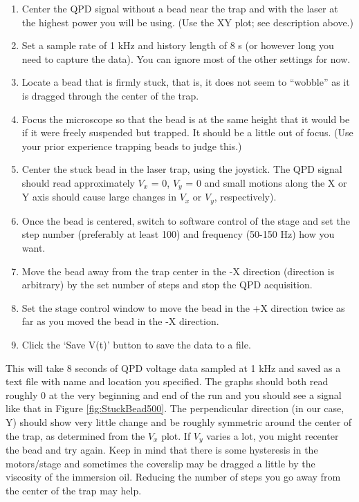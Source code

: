 \documentclass{../lab}
\begin{document}
\begin{enumerate}
    \item Center the QPD signal without a bead near the trap and with the laser at the highest power you will be using. (Use the XY plot; see description above.)

    \item Set a sample rate of 1 kHz and history length of 8 s (or however long you need to capture the data). You can ignore most of the other settings for now.

    \item Locate a bead that is firmly stuck, that is, it does not seem to ``wobble'' as it is dragged through the center of the trap.

    \item Focus the microscope so that the bead is at the same height that it would be if it were freely suspended but trapped. It should be a little out of focus. (Use your prior experience trapping beads to judge this.)

    \item Center the stuck bead in the laser trap, using the joystick. The QPD signal should read approximately $V_x$ = 0, $V_y$ = 0 and small motions along the X or Y axis should cause large changes in $V_x$ or $V_y$, respectively).

    \item Once the bead is centered, switch to software control of the stage and set the step number (preferably at least 100) and frequency (50-150 Hz) how you want.

    \item Move the bead away from the trap center in the -X direction (direction is arbitrary) by the set number of steps and stop the QPD acquisition.

    \item Set the stage control window to move the bead in the +X direction twice as far as you moved the bead in the -X direction.

    \item Click the `Save V(t)' button to save the data to a file.

\end{enumerate}

This will take 8 seconds of QPD voltage data sampled at 1 kHz and saved as a text file with name and location you specified.  The graphs should both read roughly 0 at the very beginning and end of the run and you should see a signal like that in Figure \ref{fig:StuckBead500}. The perpendicular direction (in our case, Y) should show very little change and be roughly symmetric around the center of the trap, as determined from the $V_x$ plot. If $V_y$ varies a lot, you might recenter the bead and try again. Keep in mind that there is some hysteresis in the motors/stage and sometimes the coverslip may be dragged a little by the viscosity of the immersion oil. Reducing the number of steps you go away from the center of the trap may help.
\end{document}
